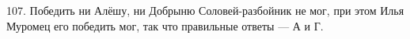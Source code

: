 107. Победить ни Алёшу, ни Добрыню Соловей-разбойник не мог, при этом Илья Муромец его победить мог, так что правильные ответы --- А и Г.\\

